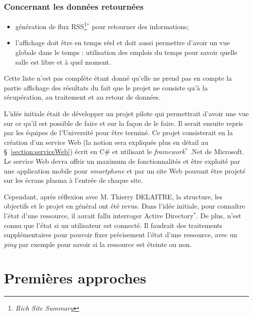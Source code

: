 \subsubsection{Concernant les donn\'ees retourn\'ees}

\begin{itemize}
	\item g\'en\'eration de flux RSS\protect\footnote{\textit{Rich Site Summary}}$^*$ pour retourner des informations;
	\item l'affichage doit \^etre en temps r\'eel et doit aussi permettre d'avoir un vue globale dans le temps : utilisation des emplois du temps pour savoir quelle salle est libre et \`a quel moment.

\end{itemize}

\vspace{0.20cm}

Cette liste n'est pas compl\`ete \'etant donn\'e qu'elle ne prend pas en compte la partie \og{}affichage\fg{} des r\'esultats du fait que le projet ne consiste qu'\`a la r\'ecup\'eration, au traitement et au retour de donn\'ees.

L'id\'ee initiale \'etait de d\'evelopper un projet pilote qui permettrait d'avoir une vue sur ce qu'il est possible de faire et sur la fa\c{c}on de le faire.
Il serait ensuite repris par les \'equipes de l'Universit\'e pour \^etre termin\'e.
Ce projet consisterait en la cr\'eation d'un service Web (la notion sera expliqu\'ee plus en d\'etail au \S~\ref{section:serviceWeb}) \'ecrit en C\# et utilisant le \textit{framework}$^*$ .Net de Microsoft.
Le service Web devra offrir un maximum de fonctionnalit\'es et \^etre exploit\'e par une application mobile pour \textit{smartphone} et par un site Web pouvant \^etre projet\'e sur les \'ecrans plasma \`a l'entr\'ee de chaque site.

Cependant, apr\`es r\'eflexion avec M. Thierry DELAITRE, la structure, les objectifs et le projet en g\'en\'eral ont \'et\'e revus.
Dans l'id\'ee initiale, pour conna\^itre l'\'etat d'une ressource, il aurait fallu interroger Active Directory$^*$. 
De plus, n'est connu que l'\'etat si un utilisateur est connect\'e.
Il faudrait des traitements suppl\'ementaires pour pouvoir fixer pr\'ecisement l'\'etat d'une ressource, avec un \textit{ping} par exemple pour savoir si la ressource est \'eteinte ou non.

\section{Premi\`eres approches}

